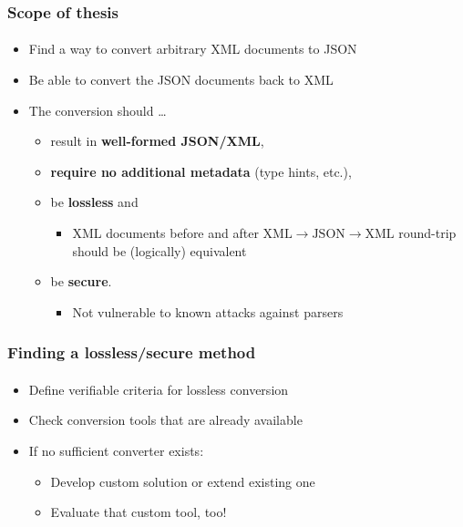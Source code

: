 \documentclass[
    alternativetitlepage=alternativ,
    cornerlogo=hgi_nds_logo2,
    sectionoverview,
]{rubpresentation}
\begin{document}
\begin{frame}
    \frametitle{Scope of thesis}
    \framesubtitle{}
    \begin{itemize}
        \item{} Find a way to convert arbitrary XML documents to JSON\\
        \item{} Be able to convert the JSON documents back to XML\\
        \item{} The conversion should \ldots\
            \begin{itemize}
                \item{} result in \textbf{well-formed JSON/XML},
                \item{} \textbf{require no additional metadata} (type hints, etc.),\\
                \item{} be \textbf{lossless} and
                    \begin{itemize}
                        \item{} XML documents before and after %
                                $\text{XML}\rightarrow\text{JSON}\rightarrow\text{XML}$ %
                                round-trip should be (logically) equivalent\\
                    \end{itemize}
                \item{} be \textbf{secure}.
                    \begin{itemize}
                        \item{} Not vulnerable to known attacks against parsers\\
                    \end{itemize}
            \end{itemize}
    \end{itemize}
\end{frame}

\begin{frame}
  \frametitle{Finding a lossless/secure method}
  \framesubtitle{}
  \begin{itemize}
    \item{} Define verifiable criteria for lossless conversion
    \item{} Check conversion tools that are already available
    \item{} If no sufficient converter exists:
      \begin{itemize}
        \item{} Develop custom solution or extend existing one
        \item{} Evaluate that custom tool, too!
      \end{itemize}
  \end{itemize}
\end{frame}
\end{document}
